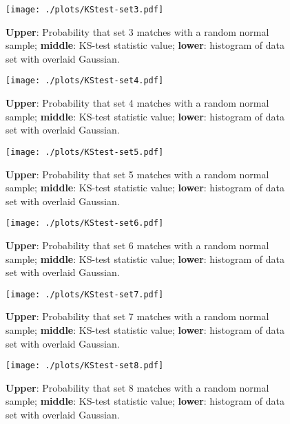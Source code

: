 \documentclass{article}
\begin{document}
\begin{figure}[!h]
\centering
\begin{minipage}[t]{7.6cm}
    \centering
    \texttt{[image: ./plots/KStest-set3.pdf]}
    \caption{\textbf{Upper}: Probability that set 3 matches with a random normal sample; \textbf{middle}: KS-test statistic value; \textbf{lower}: histogram of data set with overlaid Gaussian.}
    \label{fig:KS-3}
\end{minipage}%
\qquad
\begin{minipage}[t]{7.6cm}
    \centering
    \texttt{[image: ./plots/KStest-set4.pdf]}
    \caption{\textbf{Upper}: Probability that set 4 matches with a random normal sample; \textbf{middle}: KS-test statistic value; \textbf{lower}: histogram of data set with overlaid Gaussian.}
    \label{fig:KS-4}
\end{minipage}%
\end{figure}

\begin{figure}[!h]
\centering
\begin{minipage}[t]{7.6cm}
    \centering
    \texttt{[image: ./plots/KStest-set5.pdf]}
    \caption{\textbf{Upper}: Probability that set 5 matches with a random normal sample; \textbf{middle}: KS-test statistic value; \textbf{lower}: histogram of data set with overlaid Gaussian.}
    \label{fig:KS-5}
\end{minipage}%
\qquad
\begin{minipage}[t]{7.6cm}
    \centering
    \texttt{[image: ./plots/KStest-set6.pdf]}
    \caption{\textbf{Upper}: Probability that set 6 matches with a random normal sample; \textbf{middle}: KS-test statistic value; \textbf{lower}: histogram of data set with overlaid Gaussian.}
    \label{fig:KS-6}
\end{minipage}%
\end{figure}

\begin{figure}[!h]
\centering
\begin{minipage}[t]{7.6cm}
    \centering
    \texttt{[image: ./plots/KStest-set7.pdf]}
    \caption{\textbf{Upper}: Probability that set 7 matches with a random normal sample; \textbf{middle}: KS-test statistic value; \textbf{lower}: histogram of data set with overlaid Gaussian.}
    \label{fig:KS-7}
\end{minipage}%
\qquad
\begin{minipage}[t]{7.6cm}
    \centering
    \texttt{[image: ./plots/KStest-set8.pdf]}
    \caption{\textbf{Upper}: Probability that set 8 matches with a random normal sample; \textbf{middle}: KS-test statistic value; \textbf{lower}: histogram of data set with overlaid Gaussian.}
    \label{fig:KS-8}
\end{minipage}%
\end{figure}
\end{document}
